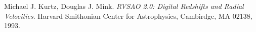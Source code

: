 \documentclass[a4paper, 11pt, oneside]{Thesis}  %
\begin{document}


\pagestyle{empty}  %



\mainmatter	  %
\pagestyle{fancy}  %




 


\begin{thebibliography}{9}

Michael J. Kurtz, Douglas J. Mink. 
\textit{RVSAO 2.0: Digital Redshifts and Radial Velocities}. 
Harvard-Smithonian Center for Astrophysics, Cambirdge, MA 02138, 1993.

 
\end{thebibliography}

\label{Bibliography}
\end{document}
